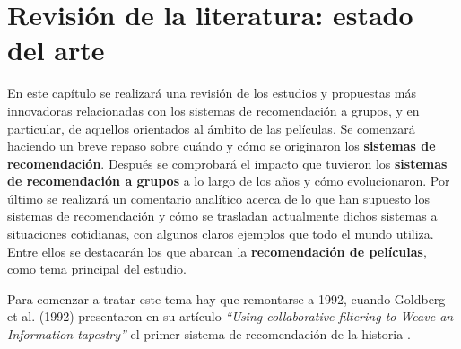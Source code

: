 \chapter{Revisión de la literatura: estado del arte}

En este capítulo se realizará una revisión de los estudios y propuestas más innovadoras relacionadas con los sistemas de recomendación a grupos, y en particular, de aquellos orientados al ámbito de las películas. Se comenzará haciendo un breve repaso sobre cuándo y cómo se originaron los \textbf{sistemas de recomendación}. Después se comprobará el impacto que tuvieron los \textbf{sistemas de recomendación a grupos} a lo largo de los años y cómo evolucionaron. Por último se realizará un comentario analítico acerca de lo que han supuesto los sistemas de recomendación y cómo se trasladan actualmente dichos sistemas a situaciones cotidianas, con algunos claros ejemplos que todo el mundo utiliza. Entre ellos se destacarán los que abarcan la \textbf{recomendación de películas}, como tema principal del estudio.

Para comenzar a tratar este tema hay que remontarse a 1992, cuando Goldberg et al. (1992) presentaron en su artículo \textit{``Using collaborative filtering to Weave an Information tapestry''} el primer sistema de recomendación de la historia \cite{tapestry-goldberg}.

